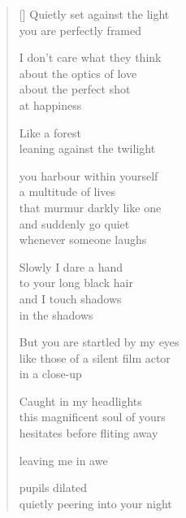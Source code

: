 \documentclass[12pt,a4paper]{article}
\begin{document}
\begin{verse}[\versewidth]
Quietly set against the light \\
you are perfectly framed

I don't care what they think \\
about the optics of love \\
about the perfect shot \\
at happiness

Like a forest \\
leaning against the twilight

you harbour within yourself \\
a multitude of lives \\
that murmur darkly like one \\
and suddenly go quiet \\
whenever someone laughs

Slowly I dare a hand \\
to your long black hair \\
and I touch shadows \\
in the shadows

But you are startled by my eyes \\
like those of a silent film actor \\
in a close-up

Caught in my headlights \\
this magnificent soul of yours \\
hesitates before fliting away

leaving me in awe

pupils dilated \\
quietly peering into your night





\end{verse}
\end{document}
